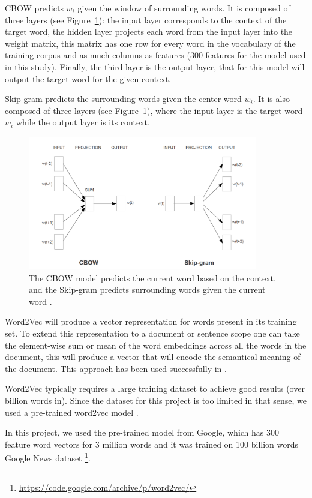CBOW predicts $w_i$ given the window of surrounding words. It is composed of three layers (see Figure~\ref{fig:word2vec}): the input layer corresponds to the context of the target word, the hidden layer projects each word from the input layer into the weight matrix, this matrix has one row for every word in the vocabulary of the training corpus and as much columns as features (300 features for the model used in this study). Finally, the third layer is the output layer, that for this model will output the target word for the given context.

Skip-gram predicts the surrounding words given the center word $w_i$. It is also composed of three layers (see Figure~\ref{fig:word2vec}), where the input layer is the target word $w_i$  while the output layer is its context. 

\begin{figure}[h]
\centering
\includegraphics[width=10cm]{Figures/word2vec.png}
\caption{The CBOW model predicts the current word based on the context, and the Skip-gram predicts surrounding words given the current word \cite{mikolov2013}.}
\label{fig:word2vec}
\end{figure}


Word2Vec will produce a vector representation for words present in its training set. To extend this representation to a document or sentence scope one can take the element-wise sum or mean of the word embeddings across all the words in the document, this will produce a vector that will encode the semantical meaning of the document. This approach has been used successfully in \cite{mikolov.phrases} \cite{sumarization}.

Word2Vec typically requires a large training dataset to achieve good results (over billion words in\cite{mikolov2013}). Since the dataset for this project is too limited in that sense, we used a pre-trained word2vec model \cite{word2vec.lexical} \cite{wmd}.

In this project, we used the pre-trained model from Google, which has 300 feature word vectors for 3 million words and it was trained on 100 billion words Google News dataset \footnote{\url{https://code.google.com/archive/p/word2vec/}}.

